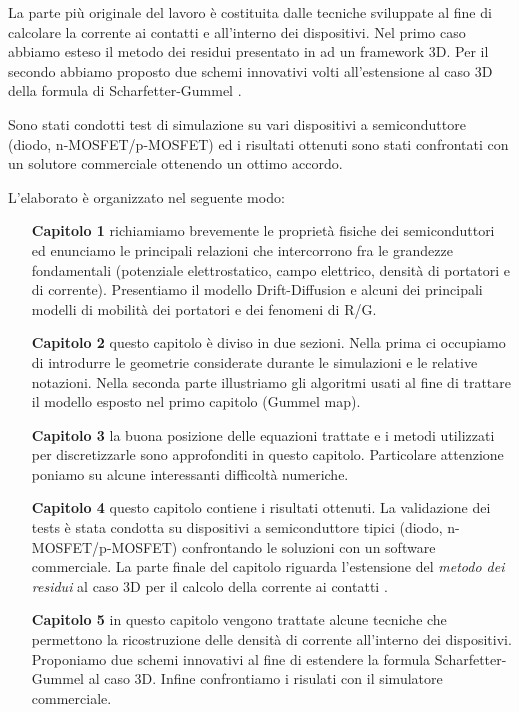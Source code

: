 La parte pi\`u originale del lavoro \`e costituita dalle tecniche sviluppate al fine di calcolare la corrente ai contatti e all'interno dei dispositivi. Nel primo caso abbiamo esteso il metodo dei residui  presentato in \cite{ContactCurrentRM} ad un framework 3D. Per il secondo abbiamo proposto due schemi innovativi volti all'estensione al caso 3D della formula di Scharfetter-Gummel \cite{Gummel:SignAnalys}.

Sono stati condotti test di simulazione su vari dispositivi a semiconduttore (diodo, n-MOSFET/p-MOSFET) ed i risultati ottenuti sono stati confrontati con un solutore commerciale ottenendo un ottimo accordo.
\vspace{1cm}

L'elaborato \`e organizzato nel seguente modo:
\begin{itemize}[leftmargin=2.5cm]
\item[\bf Capitolo 1]  richiamiamo brevemente le propriet\`a fisiche dei semiconduttori ed enunciamo le principali relazioni che intercorrono fra le grandezze fondamentali (potenziale elettrostatico, campo elettrico, densit\`a di portatori e di corrente). Presentiamo il modello Drift-Diffusion e alcuni dei principali modelli di mobilit\`a dei portatori e dei fenomeni di R/G.

\item[\bf Capitolo 2] questo capitolo \`e diviso in due sezioni. Nella prima ci occupiamo di introdurre le geometrie considerate durante le simulazioni e le relative notazioni. Nella seconda parte illustriamo gli algoritmi usati al fine di trattare il modello esposto nel primo capitolo (Gummel map).

\item[\bf Capitolo 3] la buona posizione delle equazioni trattate e i metodi utilizzati per discretizzarle sono approfonditi in questo capitolo. Particolare attenzione poniamo su alcune interessanti difficolt\`a numeriche.

\item[\bf Capitolo 4] questo capitolo contiene i risultati ottenuti. La validazione dei tests \`e stata condotta su dispositivi a semiconduttore tipici (diodo, n-MOSFET/p-MOSFET) confrontando le soluzioni con un software commerciale. La parte finale del capitolo riguarda l'estensione del \textit{metodo dei residui} al caso 3D per il calcolo della corrente ai contatti \cite{ContactCurrentRM}.

\item[\bf Capitolo 5] in questo capitolo vengono trattate alcune tecniche che permettono la ricostruzione delle densit\`a di corrente all'interno dei dispositivi. Proponiamo due schemi innovativi al fine di  estendere la formula Scharfetter-Gummel \cite{Gummel:SignAnalys} al caso 3D. Infine confrontiamo i risulati con il simulatore commerciale.
\end{itemize}


